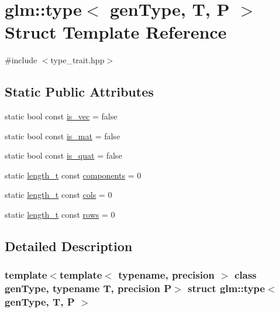 \hypertarget{structglm_1_1type}{}\section{glm\+::type$<$ gen\+Type, T, P $>$ Struct Template Reference}
\label{structglm_1_1type}


{\ttfamily \#include $<$type\+\_\+trait.\+hpp$>$}

\subsection*{Static Public Attributes}
\begin{DoxyCompactItemize}
\item 
static bool const \mbox{\hyperlink{structglm_1_1type_a6fdf149b7bcaa9a1d82e29628b7c65ee}{is\+\_\+vec}} = false
\item 
static bool const \mbox{\hyperlink{structglm_1_1type_a26e1d1fef808e586b3ed70c4b182abdf}{is\+\_\+mat}} = false
\item 
static bool const \mbox{\hyperlink{structglm_1_1type_a183d0db2aaef58410b9042663d74e487}{is\+\_\+quat}} = false
\item 
static \mbox{\hyperlink{namespaceglm_a090a0de2260835bee80e71a702492ed9}{length\+\_\+t}} const \mbox{\hyperlink{structglm_1_1type_ab7c161596abb92f6e6c6a19370d81e40}{components}} = 0
\item 
static \mbox{\hyperlink{namespaceglm_a090a0de2260835bee80e71a702492ed9}{length\+\_\+t}} const \mbox{\hyperlink{structglm_1_1type_abe7de2b1bd7b23a03a5da5ef5e66b7f7}{cols}} = 0
\item 
static \mbox{\hyperlink{namespaceglm_a090a0de2260835bee80e71a702492ed9}{length\+\_\+t}} const \mbox{\hyperlink{structglm_1_1type_a8bcdf3e3b3f2f67b70c456a6058fd300}{rows}} = 0
\end{DoxyCompactItemize}


\subsection{Detailed Description}
\subsubsection*{template$<$template$<$ typename, precision $>$ class gen\+Type, typename T, precision P$>$\newline
struct glm\+::type$<$ gen\+Type, T, P $>$}



